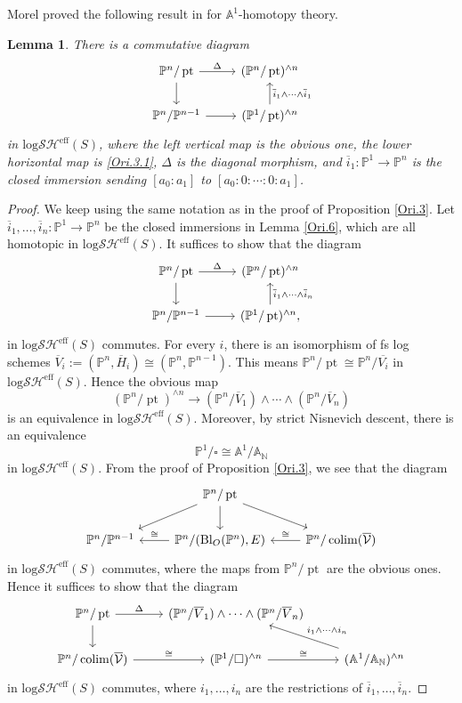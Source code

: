 \documentclass[11pt, a4paper]{amsart}
\newtheorem{lem}[thm]{Lemma}
\theoremstyle{definition}
\numberwithin{equation}{subsection}
\newcommand{\N}{\mathbb{N}}
\renewcommand{\P}{\mathbb{P}}
\newcommand{\A}{\mathbb{A}}
\newcommand{\pt}[1]{\mathrm{\pt}_{#1}}
\newcommand{\colimit}{\mathop{\rm colim}}
\newcommand{\Blow}{{\mathrm{Bl}}}
\newcommand{\ol}{\overline}
\newcommand{\cV}{\mathcal{V}}
\newcommand{\boxx}{\square}
\def\pt{\operatorname{pt}}
\newcommand{\inflogSHS}{\mathrm{log}\mathcal{SH}^{\mathrm{eff}}}
\begin{document}
Morel proved the following result in \cite{Morel_properties} for $\A^1$-homotopy theory.

\begin{lem}
\label{Ori.4}
There is a commutative diagram
\[
\begin{tikzcd}
\P^n/\pt\ar[r,"\Delta"]\ar[d]&
(\P^n/\pt)^{\wedge n}\ar[d,leftarrow,"\ol{i}_1\wedge \cdots \wedge \ol{i}_1"]
\\
\P^n/\P^{n-1}\ar[r]&
(\P^1/\pt)^{\wedge n}
\end{tikzcd}
\]
in $\inflogSHS(S)$, where the left vertical map is the obvious one, 
the lower horizontal map is \eqref{Ori.3.1}, $\Delta$ is the diagonal morphism, 
and $\ol{i}_1\colon \P^1\to \P^n$ is the closed immersion sending $[a_0:a_1]$ to $[a_0:0:\cdots:0:a_1]$.
\end{lem}
\begin{proof}
We keep using the same notation as in the proof of Proposition \ref{Ori.3}.
Let $\ol{i}_1,\ldots,\ol{i}_n\colon \P^1\to \P^n$ be the closed immersions in Lemma \ref{Ori.6}, which are all homotopic in $\inflogSHS(S)$.
It suffices to show that the diagram
\[
\begin{tikzcd}
\P^n/\pt\ar[r,"\Delta"]\ar[d]&
(\P^n/\pt)^{\wedge n}\ar[d,leftarrow,"\ol{i}_1\wedge \cdots \wedge \ol{i}_n"]
\\
\P^n/\P^{n-1}\ar[r]&
(\P^1/\pt)^{\wedge n},
\end{tikzcd}
\]
in $\inflogSHS(S)$ commutes.
For every $i$, there is an isomorphism of fs log schemes $\ol{V}_i:=(\P^n,\ol{H}_i)\cong (\P^n,\P^{n-1})$.
This means $\P^n/\pt\cong \P^n/\ol{V_i}$ in $\inflogSHS(S)$. 
Hence the obvious map
\[
(\P^n/\pt)^{\wedge n}\to (\P^n/\ol{V}_1)\wedge \cdots \wedge (\P^n/\ol{V}_n)
\]
is an equivalence in $\inflogSHS(S)$. 
Moreover, 
by strict Nisnevich descent, there is an equivalence
\[
\P^1/\boxx
\cong
\A^1/\A_\N
\]
in $\inflogSHS(S)$.
From the proof of Proposition \ref{Ori.3}, we see that the diagram
\[
\begin{tikzcd}
&
\P^n/\pt\ar[rd]\ar[d]\ar[ld]
\\
\P^n/\P^{n-1}\ar[r,"\cong",leftarrow]&
\P^n/(\Blow_O(\P^n),E)\ar[r,"\cong",leftarrow]&
\P^n/\colimit(\ol{\cV})
\end{tikzcd}
\]
in $\inflogSHS(S)$ commutes, where the maps from $\P^n/\pt$ are the obvious ones.
Hence it suffices to show that the diagram
\begin{equation}
\label{Ori.4.1}
\begin{tikzcd}
\P^n/\pt\ar[r,"\Delta"]\ar[d]&
(\P^n/\ol{V}_1)\wedge \cdots \wedge (\P^n/\ol{V}_n)
\\
\P^n/\colimit(\ol{\cV})\ar[r,"\cong"]&
(\P^1/\boxx)^{\wedge n}\ar[r,"\cong"]&
(\A^1/\A_\N)^{\wedge n}\ar[lu,"i_1\wedge \cdots \wedge i_n"']
\end{tikzcd}
\end{equation}
in $\inflogSHS(S)$ commutes, where $i_1,\ldots,i_n$ are the restrictions of $\ol{i}_1,\ldots,\ol{i}_n$.


\end{proof}
\end{document}
